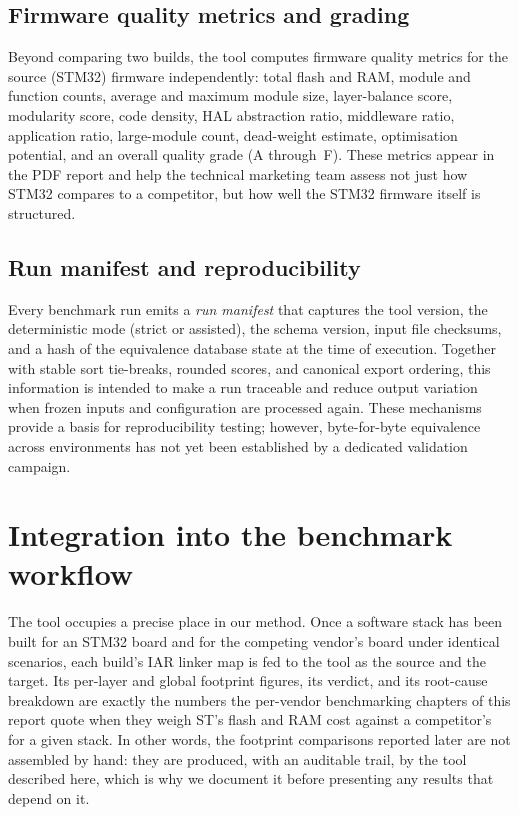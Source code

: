 \subsection{Firmware quality metrics and grading}
\label{sec:tool-quality}

Beyond comparing two builds, the tool computes firmware quality metrics for the source
(STM32) firmware independently: total flash and RAM, module and function counts, average
and maximum module size, layer-balance score, modularity score, code density, HAL
abstraction ratio, middleware ratio, application ratio, large-module count, dead-weight
estimate, optimisation potential, and an overall quality grade (A through~F). These metrics
appear in the PDF report and help the technical marketing team assess not just how STM32
compares to a competitor, but how well the STM32 firmware itself is structured.

\subsection{Run manifest and reproducibility}
\label{sec:tool-manifest}

Every benchmark run emits a \emph{run manifest} that captures the tool version, the
deterministic mode (strict or assisted), the schema version, input file checksums, and a
hash of the equivalence database state at the time of execution. Together with stable sort
tie-breaks, rounded scores, and canonical export ordering, this information is intended to
make a run traceable and reduce output variation when frozen inputs and configuration are
processed again. These mechanisms provide a basis for reproducibility testing; however,
byte-for-byte equivalence across environments has not yet been established by a dedicated
validation campaign.

\section{Integration into the benchmark workflow}
\label{sec:tool-integration}

The tool occupies a precise place in our method. Once a software stack has been built for an
STM32 board and for the competing vendor's board under identical scenarios, each build's IAR
linker map is fed to the tool as the source and the target. Its per-layer and global footprint
figures, its verdict, and its root-cause breakdown are exactly the numbers the per-vendor
benchmarking chapters of this report quote when they weigh ST's flash and RAM cost against a
competitor's for a given stack. In other words, the footprint comparisons reported later are not
assembled by hand: they are produced, with an auditable trail, by the tool described here, which
is why we document it before presenting any results that depend on it.

